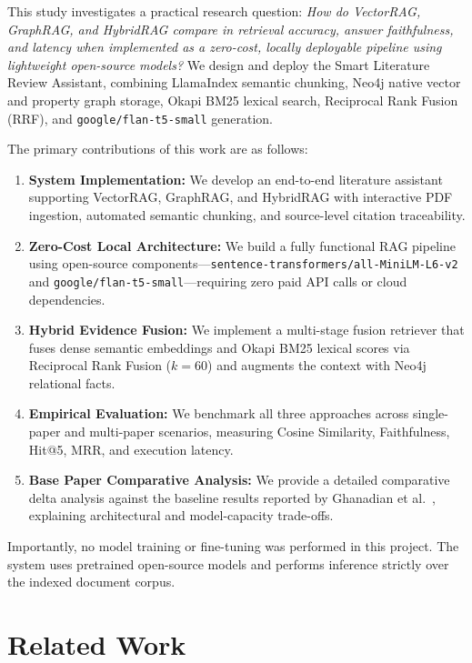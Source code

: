 \documentclass[conference]{IEEEtran}
\begin{document}
This study investigates a practical research question: \emph{How do VectorRAG, GraphRAG, and HybridRAG compare in retrieval accuracy, answer faithfulness, and latency when implemented as a zero-cost, locally deployable pipeline using lightweight open-source models?} We design and deploy the Smart Literature Review Assistant, combining LlamaIndex semantic chunking, Neo4j native vector and property graph storage, Okapi BM25 lexical search, Reciprocal Rank Fusion (RRF), and \texttt{google/flan-t5-small} generation.

The primary contributions of this work are as follows:
\begin{enumerate}
\item \textbf{System Implementation:} We develop an end-to-end literature assistant supporting VectorRAG, GraphRAG, and HybridRAG with interactive PDF ingestion, automated semantic chunking, and source-level citation traceability.
\item \textbf{Zero-Cost Local Architecture:} We build a fully functional RAG pipeline using open-source components---\texttt{sentence-transformers/all-MiniLM-L6-v2} and \texttt{google/flan-t5-small}---requiring zero paid API calls or cloud dependencies.
\item \textbf{Hybrid Evidence Fusion:} We implement a multi-stage fusion retriever that fuses dense semantic embeddings and Okapi BM25 lexical scores via Reciprocal Rank Fusion ($k=60$) and augments the context with Neo4j relational facts.
\item \textbf{Empirical Evaluation:} We benchmark all three approaches across single-paper and multi-paper scenarios, measuring Cosine Similarity, Faithfulness, Hit@5, MRR, and execution latency.
\item \textbf{Base Paper Comparative Analysis:} We provide a detailed comparative delta analysis against the baseline results reported by Ghanadian et al.\ \cite{ghanadian2026base}, explaining architectural and model-capacity trade-offs.
\end{enumerate}

Importantly, no model training or fine-tuning was performed in this project. The system uses pretrained open-source models and performs inference strictly over the indexed document corpus.


\section{Related Work}
\end{document}
